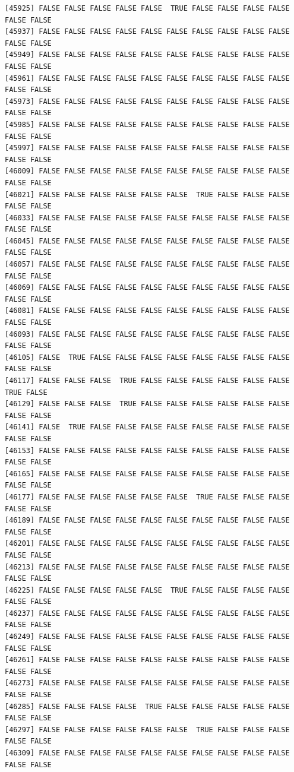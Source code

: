 \documentclass[
  a4paper,
  DIV=11,
  numbers=noendperiod]{scrartcl}
\begin{document}
\begin{verbatim}
[45925] FALSE FALSE FALSE FALSE FALSE  TRUE FALSE FALSE FALSE FALSE FALSE FALSE
[45937] FALSE FALSE FALSE FALSE FALSE FALSE FALSE FALSE FALSE FALSE FALSE FALSE
[45949] FALSE FALSE FALSE FALSE FALSE FALSE FALSE FALSE FALSE FALSE FALSE FALSE
[45961] FALSE FALSE FALSE FALSE FALSE FALSE FALSE FALSE FALSE FALSE FALSE FALSE
[45973] FALSE FALSE FALSE FALSE FALSE FALSE FALSE FALSE FALSE FALSE FALSE FALSE
[45985] FALSE FALSE FALSE FALSE FALSE FALSE FALSE FALSE FALSE FALSE FALSE FALSE
[45997] FALSE FALSE FALSE FALSE FALSE FALSE FALSE FALSE FALSE FALSE FALSE FALSE
[46009] FALSE FALSE FALSE FALSE FALSE FALSE FALSE FALSE FALSE FALSE FALSE FALSE
[46021] FALSE FALSE FALSE FALSE FALSE FALSE  TRUE FALSE FALSE FALSE FALSE FALSE
[46033] FALSE FALSE FALSE FALSE FALSE FALSE FALSE FALSE FALSE FALSE FALSE FALSE
[46045] FALSE FALSE FALSE FALSE FALSE FALSE FALSE FALSE FALSE FALSE FALSE FALSE
[46057] FALSE FALSE FALSE FALSE FALSE FALSE FALSE FALSE FALSE FALSE FALSE FALSE
[46069] FALSE FALSE FALSE FALSE FALSE FALSE FALSE FALSE FALSE FALSE FALSE FALSE
[46081] FALSE FALSE FALSE FALSE FALSE FALSE FALSE FALSE FALSE FALSE FALSE FALSE
[46093] FALSE FALSE FALSE FALSE FALSE FALSE FALSE FALSE FALSE FALSE FALSE FALSE
[46105] FALSE  TRUE FALSE FALSE FALSE FALSE FALSE FALSE FALSE FALSE FALSE FALSE
[46117] FALSE FALSE FALSE  TRUE FALSE FALSE FALSE FALSE FALSE FALSE  TRUE FALSE
[46129] FALSE FALSE FALSE  TRUE FALSE FALSE FALSE FALSE FALSE FALSE FALSE FALSE
[46141] FALSE  TRUE FALSE FALSE FALSE FALSE FALSE FALSE FALSE FALSE FALSE FALSE
[46153] FALSE FALSE FALSE FALSE FALSE FALSE FALSE FALSE FALSE FALSE FALSE FALSE
[46165] FALSE FALSE FALSE FALSE FALSE FALSE FALSE FALSE FALSE FALSE FALSE FALSE
[46177] FALSE FALSE FALSE FALSE FALSE FALSE  TRUE FALSE FALSE FALSE FALSE FALSE
[46189] FALSE FALSE FALSE FALSE FALSE FALSE FALSE FALSE FALSE FALSE FALSE FALSE
[46201] FALSE FALSE FALSE FALSE FALSE FALSE FALSE FALSE FALSE FALSE FALSE FALSE
[46213] FALSE FALSE FALSE FALSE FALSE FALSE FALSE FALSE FALSE FALSE FALSE FALSE
[46225] FALSE FALSE FALSE FALSE FALSE  TRUE FALSE FALSE FALSE FALSE FALSE FALSE
[46237] FALSE FALSE FALSE FALSE FALSE FALSE FALSE FALSE FALSE FALSE FALSE FALSE
[46249] FALSE FALSE FALSE FALSE FALSE FALSE FALSE FALSE FALSE FALSE FALSE FALSE
[46261] FALSE FALSE FALSE FALSE FALSE FALSE FALSE FALSE FALSE FALSE FALSE FALSE
[46273] FALSE FALSE FALSE FALSE FALSE FALSE FALSE FALSE FALSE FALSE FALSE FALSE
[46285] FALSE FALSE FALSE FALSE  TRUE FALSE FALSE FALSE FALSE FALSE FALSE FALSE
[46297] FALSE FALSE FALSE FALSE FALSE FALSE  TRUE FALSE FALSE FALSE FALSE FALSE
[46309] FALSE FALSE FALSE FALSE FALSE FALSE FALSE FALSE FALSE FALSE FALSE FALSE

\end{verbatim}
\end{document}
